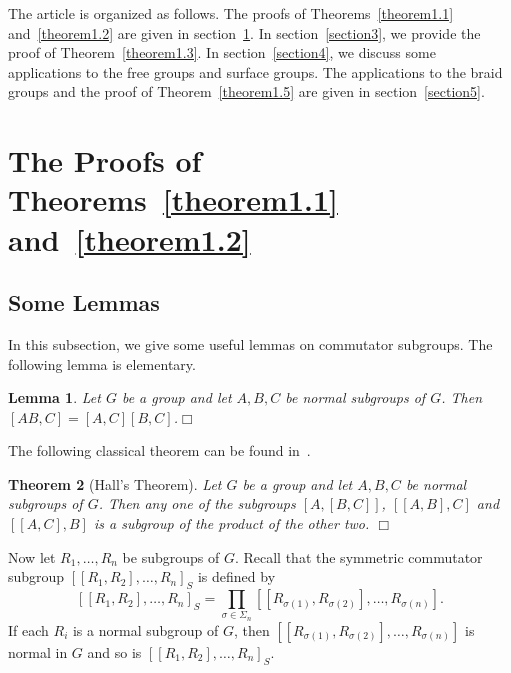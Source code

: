 \documentclass[10pt]{amsart}
\newtheorem{thm}{Theorem}[section]
\newtheorem{lem}[thm]{Lemma}
\numberwithin{equation}{section}
\begin{document}
The article is organized as follows. The proofs of Theorems~\ref{theorem1.1} and~\ref{theorem1.2} are given in section~\ref{section2}. In section~\ref{section3}, we provide the proof of Theorem~\ref{theorem1.3}. In section~\ref{section4}, we discuss some applications to the free groups and surface groups. The applications to the braid groups and the proof of Theorem~\ref{theorem1.5} are given in section~\ref{section5}.

\section{The Proofs of Theorems~\ref{theorem1.1} and~\ref{theorem1.2}}\label{section2}
\subsection{Some Lemmas}
In this subsection, we give some useful lemmas on commutator subgroups. The following lemma is elementary.

\begin{lem}\label{lemma2.1}
Let $G$ be a group and let $A,B,C$ be normal subgroups of $G$. Then $[AB,C]=[A,C][B,C]$.\hfill $\Box$
\end{lem}

The following classical theorem can be found in~\cite[Theorem 5.2, p.290]{MKS}.

\begin{thm}[Hall's Theorem]
Let $G$ be a group and let $A,B,C$ be normal subgroups of $G$. Then any one of the subgroups $[A,[B,C]]$, $[[A,B],C]$ and $[[A,C],B]$ is a subgroup of the product of the other two.
\hfill $\Box$
\end{thm}

Now let $R_1,\ldots,R_n$ be subgroups of $G$. Recall that the symmetric commutator subgroup $[[R_1,R_2],\ldots,R_n]_S$ is defined by
$$
[[R_1,R_2],\ldots,R_n]_S=\prod_{\sigma\in \Sigma_n}[[R_{\sigma(1)},R_{\sigma(2)}],\ldots,R_{\sigma(n)}].
$$
If each $R_i$ is a normal subgroup of $G$, then $[[R_{\sigma(1)},R_{\sigma(2)}],\ldots,R_{\sigma(n)}]$ is normal in $G$ and so is $[[R_1,R_2],\ldots,R_n]_S$.
\end{document}
